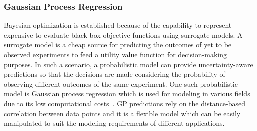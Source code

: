 \subsubsection{Gaussian Process Regression}

Bayesian optimization is established because of the capability to represent expensive-to-evaluate black-box objective functions using surrogate models. A surrogate model is a cheap source for predicting the outcomes of yet to be observed experiments to feed a utility value function for decision-making purposes. In such a scenario, a probabilistic model can provide uncertainty-aware predictions so that the decisions are made considering the probability of observing different outcomes of the same experiment. One such probabilistic model is Gaussian process regression which is used for modeling in various fields due to its low computational costs~\cite{Rasmussen:2005:GPM:1162254}. GP predictions rely on the distance-based correlation between data points and it is a flexible model which can be easily manipulated to suit the modeling requirements of different applications.

